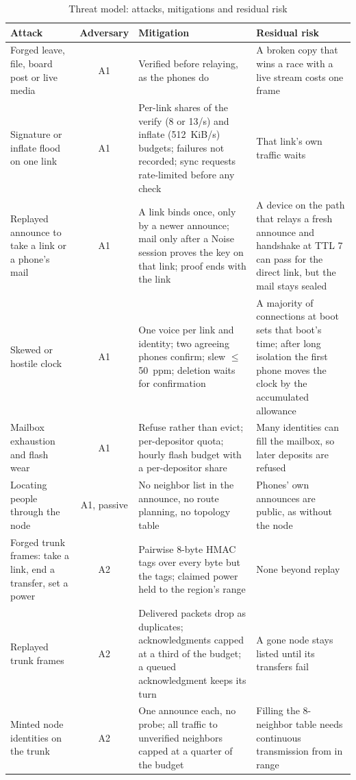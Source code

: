 \documentclass[conference]{IEEEtran}
\begin{document}
\begin{table}[t]
\caption{Threat model: attacks, mitigations and residual risk}
\label{tab:threats}
\centering
\scriptsize
\renewcommand{\arraystretch}{1.12}
\begin{tabular}{@{}L{3.5cm}cL{6.5cm}L{5.4cm}@{}}
\toprule
Attack & Adversary & Mitigation & Residual risk \\
\midrule
Forged leave, file, board post or live media & A1 & Verified before relaying, as the phones do & A broken copy that wins a race with a live stream costs one frame \\
Signature or inflate flood on one link & A1 & Per-link shares of the verify (8 or 13/s) and inflate (512~KiB/s) budgets; failures not recorded; sync requests rate-limited before any check & That link's own traffic waits \\
Replayed announce to take a link or a phone's mail & A1 & A link binds once, only by a newer announce; mail only after a Noise session proves the key on that link; proof ends with the link & A device on the path that relays a fresh announce and handshake at TTL 7 can pass for the direct link, but the mail stays sealed \\
Skewed or hostile clock & A1 & One voice per link and identity; two agreeing phones confirm; slew $\le$50~ppm; deletion waits for confirmation & A majority of connections at boot sets that boot's time; after long isolation the first phone moves the clock by the accumulated allowance \\
Mailbox exhaustion and flash wear & A1 & Refuse rather than evict; per-depositor quota; hourly flash budget with a per-depositor share & Many identities can fill the mailbox, so later deposits are refused \\
Locating people through the node & A1, passive & No neighbor list in the announce, no route planning, no topology table & Phones' own announces are public, as without the node \\
Forged trunk frames: take a link, end a transfer, set a power & A2 & Pairwise 8-byte HMAC tags over every byte but the tags; claimed power held to the region's range & None beyond replay \\
Replayed trunk frames & A2 & Delivered packets drop as duplicates; acknowledgments capped at a third of the budget; a queued acknowledgment keeps its turn & A gone node stays listed until its transfers fail \\
Minted node identities on the trunk & A2 & One announce each, no probe; all traffic to unverified neighbors capped at a quarter of the budget & Filling the 8-neighbor table needs continuous transmission from in range \\

\end{tabular}
\end{table}
\end{document}
